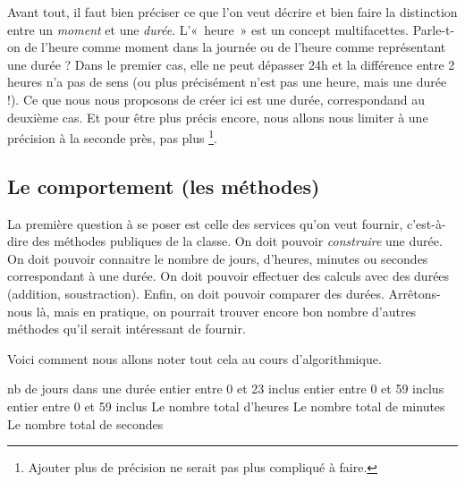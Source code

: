 		Avant tout, il faut bien préciser ce que l’on veut décrire
		et bien faire la distinction entre un \emph{moment} et une \emph{durée}.
		L’«~heure~» est un concept multifacettes. 
		Parle-t-on de l’heure comme moment dans la journée 
		ou de l’heure comme représentant une durée ? 
		Dans le premier cas, elle ne peut dépasser 24h 
		et la différence entre 2 heures n’a pas de sens 
		(ou plus précisément n’est pas une heure, mais une durée !).
		Ce que nous nous proposons de créer ici est une durée,
		correspondand au deuxième cas.
		Et pour être plus précis encore,
		nous allons nous limiter à une précision à la seconde près,
		pas plus%
		\footnote{%
			Ajouter plus de précision ne serait pas plus compliqué à faire.%
		}.
	
	\subsection{Le comportement (les méthodes)}
	
		La première question à se poser est celle des services qu’on veut
		fournir, c’est-à-dire des méthodes publiques de la classe. On doit
		pouvoir \textit{construire} une durée. On doit pouvoir connaitre le
		nombre de jours, d’heures, minutes ou secondes correspondant à une durée. On doit
		pouvoir effectuer des calculs avec des durées (addition, soustraction).
		Enfin, on doit pouvoir comparer des durées. Arrêtons-nous là, mais en
		pratique, on pourrait trouver encore bon nombre d’autres méthodes qu’il
		serait intéressant de fournir. 
		
		Voici comment nous allons noter tout cela au cours d'algorithmique.
		
		\begin{LDA}
				\Public
					\Empty
					\RComment nb de jours dans une durée
					\RComment entier entre 0 et 23 inclus
					\RComment entier entre 0 et 59 inclus
					\RComment entier entre 0 et 59 inclus
					\Empty
					\RComment Le nombre total d’heures
					\RComment Le nombre total de minutes
					\RComment Le nombre total de secondes
					\Empty
			\EndClass
		\end{LDA}
		
